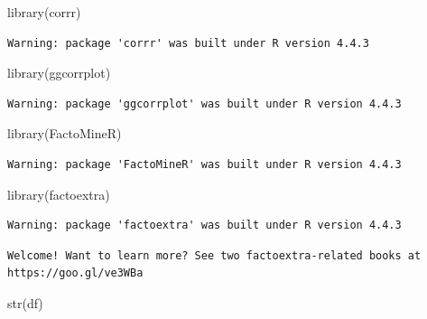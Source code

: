 \documentclass[
  letterpaper,
  DIV=11,
  numbers=noendperiod]{scrartcl}
\newenvironment{Shaded}{\begin{snugshade}}{\end{snugshade}}
\newcommand{\FunctionTok}[1]{\textcolor[rgb]{0.28,0.35,0.67}{#1}}
\newcommand{\NormalTok}[1]{\textcolor[rgb]{0.00,0.23,0.31}{#1}}
\begin{document}
\begin{Shaded}
\begin{Highlighting}[]
\FunctionTok{library}\NormalTok{(corrr)}
\end{Highlighting}
\end{Shaded}

\begin{verbatim}
Warning: package 'corrr' was built under R version 4.4.3
\end{verbatim}

\begin{Shaded}
\begin{Highlighting}[]
\FunctionTok{library}\NormalTok{(ggcorrplot)}
\end{Highlighting}
\end{Shaded}

\begin{verbatim}
Warning: package 'ggcorrplot' was built under R version 4.4.3
\end{verbatim}

\begin{Shaded}
\begin{Highlighting}[]
\FunctionTok{library}\NormalTok{(FactoMineR)}
\end{Highlighting}
\end{Shaded}

\begin{verbatim}
Warning: package 'FactoMineR' was built under R version 4.4.3
\end{verbatim}

\begin{Shaded}
\begin{Highlighting}[]
\FunctionTok{library}\NormalTok{(factoextra)}
\end{Highlighting}
\end{Shaded}

\begin{verbatim}
Warning: package 'factoextra' was built under R version 4.4.3
\end{verbatim}

\begin{verbatim}
Welcome! Want to learn more? See two factoextra-related books at https://goo.gl/ve3WBa
\end{verbatim}

\begin{Shaded}
\begin{Highlighting}[]
\FunctionTok{str}\NormalTok{(df)}
\end{Highlighting}
\end{Shaded}
\end{document}
